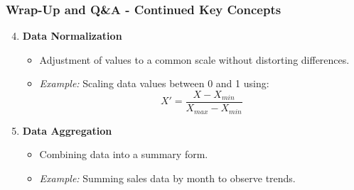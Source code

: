 \documentclass[aspectratio=169]{beamer}
\begin{document}
\begin{frame}[fragile]
    \frametitle{Wrap-Up and Q\&A - Continued Key Concepts}
    \begin{enumerate}
        \setcounter{enumi}{3} %
        \item \textbf{Data Normalization}
        \begin{itemize}
            \item Adjustment of values to a common scale without distorting differences.
            \item \textit{Example:} Scaling data values between 0 and 1 using:
            \begin{equation}
            X' = \frac{X - X_{min}}{X_{max} - X_{min}}
            \end{equation}
        \end{itemize}
        
        \item \textbf{Data Aggregation}
        \begin{itemize}
            \item Combining data into a summary form.
            \item \textit{Example:} Summing sales data by month to observe trends.
        \end{itemize}
    \end{enumerate}
\end{frame}
\end{document}
